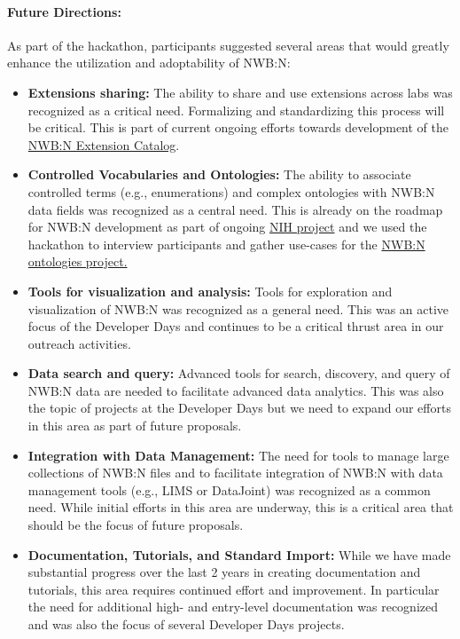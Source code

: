 \documentclass{article}
\begin{document}
\paragraph{Future Directions:} As part of the hackathon, participants suggested several areas that would greatly enhance the utilization and adoptability of NWB:N:
\begin{itemize}
  \setlength\itemsep{0cm}
  \item \textbf{Extensions sharing:} The ability to share and use extensions across labs was recognized as a critical need. Formalizing and standardizing this process will be critical. This is part of current ongoing efforts towards development of the \href{https://github.com/nwb-extensions}{NWB:N Extension Catalog}.
  \item \textbf{Controlled Vocabularies and Ontologies:} The ability to associate controlled terms  (e.g., enumerations) and complex ontologies with NWB:N data fields was recognized as a central need. This is already on the roadmap for NWB:N development as part of ongoing \href{https://braininitiative.nih.gov/funded-awards/nwbn-data-standard-and-software-ecosystem-neurophysiology}{NIH project} and we used the hackathon to interview participants and gather use-cases for the \href{https://github.com/NeurodataWithoutBorders/ontology-project}{NWB:N ontologies project.}
  \item \textbf{Tools for visualization and analysis:} Tools for exploration and visualization of NWB:N was recognized as a general need. This was an active focus of the Developer Days and continues to be a critical thrust area in our outreach activities. 
  \item \textbf{Data search and query:} Advanced tools for search, discovery, and query of NWB:N data are needed to facilitate advanced data analytics. This was also the topic of projects at the Developer Days but we need to expand our efforts in this area as part of future proposals. 
  \item \textbf{Integration with Data Management:} The need for tools to manage large collections of NWB:N files and to facilitate integration of NWB:N with data management tools (e.g., LIMS or DataJoint) was recognized as a common need. While initial efforts in this area are underway, this is a critical area that should be the focus of future proposals. 
  \item \textbf{Documentation, Tutorials, and Standard Import:} While we have made substantial progress over the last 2 years in creating documentation and tutorials, this area requires continued effort and improvement. In particular the need for additional high- and entry-level documentation was recognized and was also the focus of several Developer Days projects. 
\end{itemize}
\end{document}

